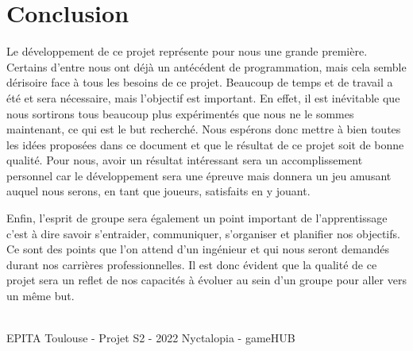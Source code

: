 \section{Conclusion}

Le développement de ce projet représente pour nous une grande première.
Certains d’entre nous ont déjà un antécédent de programmation, mais cela
semble dérisoire face à tous les besoins de ce projet. Beaucoup de temps et de
travail a été et sera nécessaire, mais l’objectif est important. En effet, il est inévitable
que nous sortirons tous beaucoup plus expérimentés que nous ne le sommes maintenant, ce qui est le but recherché. Nous espérons donc mettre à bien toutes les
idées proposées dans ce document et que le résultat de ce projet soit de bonne
qualité. Pour nous, avoir un résultat intéressant sera un accomplissement personnel car le développement sera une épreuve mais donnera un jeu amusant
auquel nous serons, en tant que joueurs, satisfaits en y jouant.

Enfin, l'esprit de groupe sera également un point important de l'apprentissage c'est à dire savoir s'entraider, communiquer, s'organiser et planifier nos objectifs. Ce sont des points que l'on attend d'un ingénieur et qui nous seront demandés durant nos carrières professionnelles. Il est donc évident que la qualité de ce projet sera un reflet de nos capacités à évoluer au sein d'un groupe pour aller vers un même but.

\vfill
\noindent\makebox[\linewidth]{\rule{.8\paperwidth}{.6pt}}\\[0.2cm]
EPITA Toulouse - Projet S2 - 2022 \hfill Nyctalopia - gameHUB
\noindent\makebox[\linewidth]{\rule{.8\paperwidth}{.6pt}}